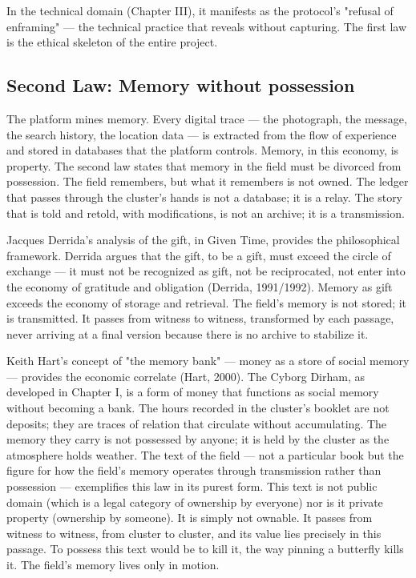 In the technical domain (Chapter III), it manifests as the  protocol's "refusal of enframing" — the technical practice that reveals without capturing. The first law is the ethical skeleton of the entire project.

\subsection{Second Law: Memory without possession}

The platform mines memory. Every digital trace — the photograph, the message, the search history, the location data — is extracted from the flow of experience and stored in databases that the platform controls. Memory, in this economy, is property. The second law states that memory in the field must be divorced from possession. The field remembers, but what it remembers is not owned. The ledger that passes through the cluster's hands is not a database; it is a relay. The story that is told and retold, with modifications, is not an archive; it is a transmission.

Jacques Derrida's analysis of the gift, in Given Time, provides the philosophical framework. Derrida argues that the gift, to be a gift, must exceed the circle of exchange — it must not be recognized as gift, not be reciprocated, not enter into the economy of gratitude and obligation (Derrida, 1991/1992). Memory as gift exceeds the economy of storage and retrieval. The field's memory is not stored; it is transmitted. It passes from witness to witness, transformed by each passage, never arriving at a final version because there is no archive to stabilize it.

Keith Hart's concept of "the memory bank" — money as a store of social memory — provides the economic correlate (Hart, 2000). The Cyborg Dirham, as developed in Chapter I, is a form of money that functions as social memory without becoming a bank. The hours recorded in the cluster's booklet are not deposits; they are traces of relation that circulate without accumulating. The memory they carry is not possessed by anyone; it is held by the cluster as the atmosphere holds weather. The text of the field — not a particular book but the figure for how the field's memory operates through transmission rather than possession — exemplifies this law in its purest form. This text is not public domain (which is a legal category of ownership by everyone) nor is it private property (ownership by someone). It is simply not ownable. It passes from witness to witness, from cluster to cluster, and its value lies precisely in this passage. To possess this text would be to kill it, the way pinning a butterfly kills it. The field's memory lives only in motion.

